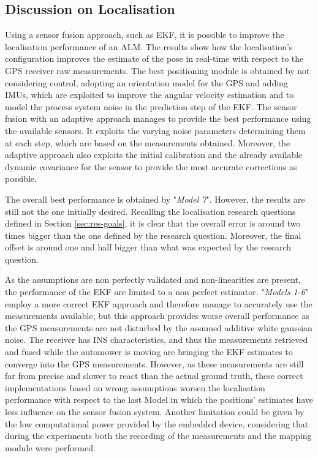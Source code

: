 \subsection{Discussion on Localisation}
\noindent
Using a sensor fusion approach, such as \gls{EKF}, it is possible to improve the localisation performance of an \gls{ALM}.
The results show how the localisation's configuration improves the estimate of the pose in real-time with respect to the \gls{GPS} receiver raw measurements.
The best positioning module is obtained by not considering control, adopting an orientation model for the \gls{GPS} and adding \glspl{IMU}, which are exploited to improve the angular velocity estimation and to model the process system noise in the prediction step of the \gls{EKF}. %
The sensor fusion with an adaptive approach manages to provide the best performance using the available sensors.
It exploits the varying noise parameters determining them at each step, which are based on the measurements obtained.
Moreover, the adaptive approach also exploits the initial calibration and the already available dynamic covariance for the sensor to provide the most accurate corrections as possible.

The overall best performance is obtained by "\textit{Model 7}".
However, the results are still not the one initially desired.
Recalling the localisation research questions defined in Section \ref{sec:res-goals}, it is clear that the overall error is around two times bigger than the one defined by the research question.
Moreover, the final offset is around one and half bigger than what was expected by the research question.


As the assumptions are non perfectly validated and non-linearities are present, the performance of the \gls{EKF} are limited to a non perfect estimator. "\textit{Models 1-6}" employ a more correct \gls{EKF} approach and therefore manage to accurately use the measurements available, but this approach provides worse overall performance as the \gls{GPS} measurements are not disturbed by the assumed additive white gaussian noise. 
The receiver has \gls{INS} characteristics, and thus the measurements retrieved and fused while the automower is moving are bringing the \gls{EKF} estimates to converge into the \gls{GPS} measurements.
However, as these measurements are still far from precise and slower to react than the actual ground truth, these correct implementations based on wrong assumptions worsen the localisation performance with respect to the last Model in which the positions' estimates have less influence on the sensor fusion system. 
Another limitation could be given by the low computational power provided by the embedded device, considering that during the experiments both the recording of the measurements and the mapping module were performed.


